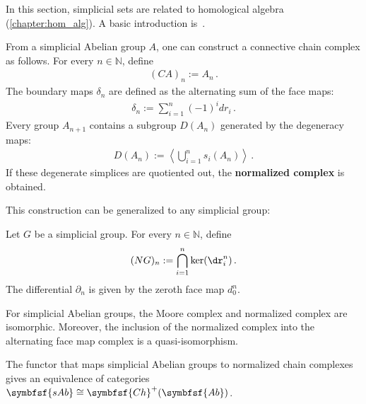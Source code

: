     In this section, simplicial sets are related to homological algebra (\cref{chapter:hom_alg}). A basic introduction is~\citet{master_why_2020}.

    \begin{construct}
        From a simplicial Abelian group $A$, one can construct a connective chain complex as follows. For every $n\in\mathbb{N}$, define
        \begin{gather}
            (CA)_n := A_n\,.
        \end{gather}
        The boundary maps $\delta_n$ are defined as the alternating sum of the face maps:
        \begin{gather}
            \delta_n := \sum_{i=1}^n(-1)^idr_i\,.
        \end{gather}
        Every group $A_{n+1}$ contains a subgroup $D(A_n)$ generated by the degeneracy maps:
        \begin{gather}
            D(A_n) := \left\langle\bigcup_{i=1}^ns_i(A_n)\right\rangle\,.
        \end{gather}
        If these degenerate simplices are quotiented out, the \textbf{normalized complex} is obtained.
    \end{construct}
    This construction can be generalized to any simplicial group:
    \begin{construct}
        Let $G$ be a simplicial group. For every $n\in\mathbb{N}$, define
        \begin{gather}
            (NG)_n := \bigcap_{i=1}^n\ker(\dr^n_i)\,.
        \end{gather}
        The differential $\partial_n$ is given by the zeroth face map $d^n_0$.
    \end{construct}
    \begin{property}[Equivalence]
        For simplicial Abelian groups, the Moore complex and normalized complex are isomorphic. Moreover, the inclusion of the normalized complex into the alternating face map complex is a quasi-isomorphism.
    \end{property}

    \begin{theorem}\label{model:dold_kan}
        The functor that maps simplicial Abelian groups to normalized chain complexes gives an equivalence of categories $\symbfsf{sAb}\cong\symbfsf{Ch}^+(\symbfsf{Ab})$.
    \end{theorem}

